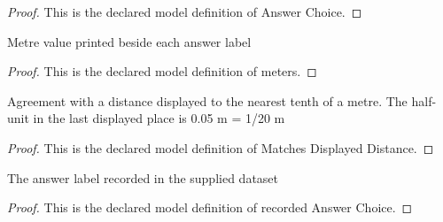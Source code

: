 \begin{proof}
  This is the declared model definition of Answer Choice.
\end{proof}
\begin{definition}[meters]
  \label{def:physics:phyx-mini-0175:phyxminiproblems-problemphyxmini0175-answerchoice-meters}
  Metre value printed beside each answer label
\end{definition}
\begin{proof}
  This is the declared model definition of meters.
\end{proof}
\begin{definition}
  \label{def:physics:phyx-mini-0175:phyxminiproblems-problemphyxmini0175-matchesdisplayeddistance}
  Agreement with a distance displayed to the nearest tenth of a metre. The half-unit in the last displayed place is 0.05 m = 1/20 m
\end{definition}
\begin{proof}
  This is the declared model definition of Matches Displayed Distance.
\end{proof}
\begin{definition}
  \label{def:physics:phyx-mini-0175:phyxminiproblems-problemphyxmini0175-recordedanswerchoice}
  The answer label recorded in the supplied dataset
\end{definition}
\begin{proof}
  This is the declared model definition of recorded Answer Choice.
\end{proof}
